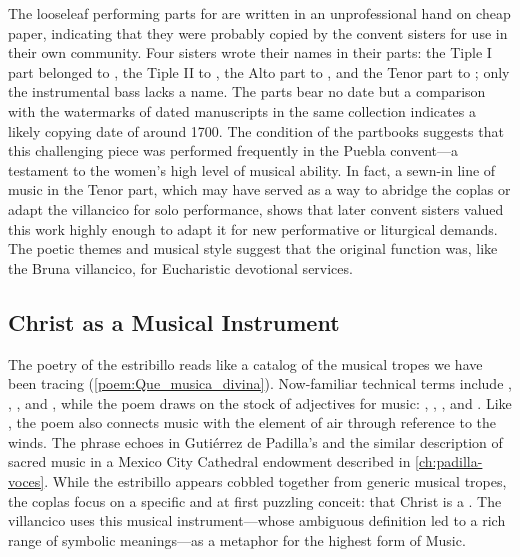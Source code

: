 The looseleaf performing parts for  are written in an
unprofessional hand on cheap paper, indicating that they were probably copied
by the convent sisters for use in their own community.
Four sisters wrote their names in their parts:
the Tiple I part belonged to , the Tiple II to , the Alto part to , and the Tenor part
to ; only the instrumental bass lacks a name.
The parts bear no date but a comparison with the watermarks of dated
manuscripts in the same collection indicates a likely copying date of around
1700.
The condition of the partbooks suggests that this challenging piece was
performed frequently in the Puebla convent---a testament to the women's high
level of musical ability.%
    \citXXX[cesar]
In fact, a sewn-in line of music in the Tenor part, which may have served as a
way to abridge the coplas or adapt the villancico for solo performance, shows
that later convent sisters valued this work highly enough to adapt it for new
performative or liturgical demands.
The poetic themes and musical style suggest that the original function was,
like the Bruna villancico, for Eucharistic devotional services.


\subsection{Christ as a Musical Instrument}

The poetry of the estribillo reads like a catalog of the musical tropes we have
been tracing (\cref{poem:Que_musica_divina}).
Now-familiar technical terms include , ,
, and , while the poem draws on the stock
of adjectives for music: , ,
, and .
Like , the poem also connects music with the element of
air through reference to the winds.
The phrase  echoes  in Gutiérrez de Padilla's  and the
similar description of sacred music in a Mexico City Cathedral endowment
described in \cref{ch:padilla-voces}.
While the estribillo appears cobbled together from generic musical tropes, the
coplas focus on a specific and at first puzzling conceit: that Christ is a
.
The villancico uses this musical instrument---whose ambiguous definition led to
a rich range of symbolic meanings---as a metaphor for the highest form of
Music.

